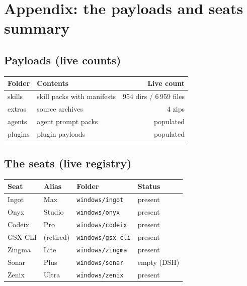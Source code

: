 \chapter{Appendix: the payloads and seats summary}

\section*{Payloads (live counts)}
\begin{tabular}{@{}llr@{}}
\toprule
\rowcolor{fusionteal!22} \textbf{Folder} & \textbf{Contents} & \textbf{Live count}\\
\midrule
skills & skill packs with manifests & 954 dirs / 6\,959 files\\
extras & source archives & 4 zips\\
agents & agent prompt packs & populated\\
plugins & plugin payloads & populated\\
\bottomrule
\end{tabular}

\section*{The seats (live registry)}
\begin{tabular}{@{}llll@{}}
\toprule
\rowcolor{fusionblue!22} \textbf{Seat} & \textbf{Alias} & \textbf{Folder} & \textbf{Status}\\
\midrule
Ingot & Max & \texttt{windows/ingot} & present\\
Onyx & Studio & \texttt{windows/onyx} & present\\
Codeix & Pro & \texttt{windows/codeix} & present\\
GSX-CLI & (retired) & \texttt{windows/gsx-cli} & present\\
Zingma & Lite & \texttt{windows/zingma} & present\\
Sonar & Plus & \texttt{windows/sonar} & empty (DSH)\\
Zenix & Ultra & \texttt{windows/zenix} & present\\
\bottomrule
\end{tabular}
